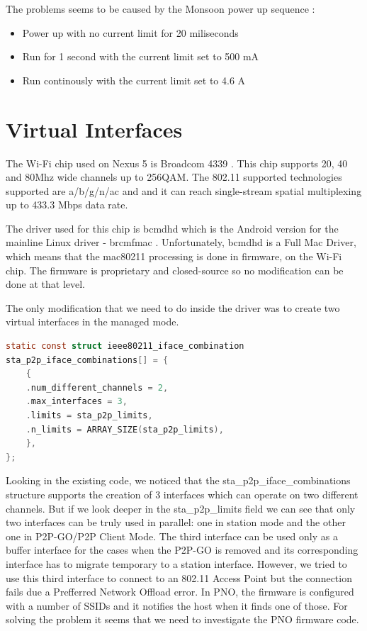 
The problems seems to be caused by the Monsoon power up sequence \cite{cite-manualmonsoon}:
\begin{itemize}
  \item Power up with no current limit for 20 miliseconds
  \item Run for 1 second with the current limit set to 500 mA
  \item Run continously with the current limit set to 4.6 A
\end{itemize}

\section{Virtual Interfaces}
\label{sec:virtual-interfaces}

The Wi-Fi chip used on Nexus 5 is Broadcom 4339 \cite{cite-wifichip} \cite{cite-ifixit}. This chip supports 20, 40 and 80Mhz wide channels up to 256QAM. The 802.11 supported technologies supported are a/b/g/n/ac and and it can reach single-stream spatial multiplexing up to 433.3 Mbps data rate. 

The driver used for this chip is bcmdhd which is the Android version for the mainline Linux driver - brcmfmac \cite{cite-brcmfmac}. Unfortunately, bcmdhd is a Full Mac Driver, which means that the mac80211 processing is done in firmware, on the Wi-Fi chip. The firmware is proprietary and closed-source so no modification can be done at that level.

The only modification that we need to do inside the driver was to create two virtual interfaces in the managed mode. 

\begin{lstlisting}[language=C, frame=single, caption={Interface combinations for bcmdh driver},label=InterfaceCombinations]
static const struct ieee80211_iface_combination
sta_p2p_iface_combinations[] = {
	{
	.num_different_channels = 2,
	.max_interfaces = 3,
	.limits = sta_p2p_limits,
	.n_limits = ARRAY_SIZE(sta_p2p_limits),
	},
};
\end{lstlisting}

Looking in the existing code, we noticed that the sta_p2p_iface_combinations structure supports the creation of 3 interfaces which can operate on two different channels. But if we look deeper in the sta_p2p_limits field we can see that only two interfaces can be truly used in parallel: one in station mode and the other one in P2P-GO/P2P Client Mode. The third interface can be used only as a buffer interface for the cases when the P2P-GO is removed and its corresponding interface has to migrate temporary to a station interface. However, we tried to use this third interface to connect to an 802.11 Access Point but the connection fails due a Prefferred Network Offload error. In PNO, the firmware is configured with a number of SSIDs and it notifies the host when it finds one of those. For solving the problem it seems that we need to investigate the PNO firmware code.

